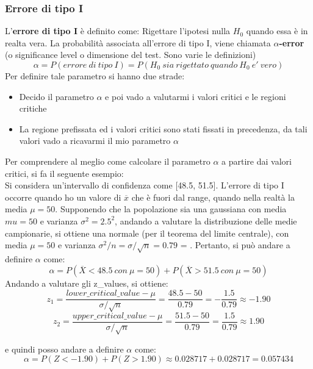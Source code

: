 \subsubsection{Errore di tipo I}
L'\textbf{errore di tipo I} è definito come: Rigettare l'ipotesi nulla \(H_0\) quando essa è in realta vera. La probabilità associata all'errore di tipo I, viene chiamata \textbf{\(\alpha\)-error} (o significance level o dimensione del test. Sono varie le definizioni)
\[
\alpha = P(errore\ di\ tipo\ I) = P(H_0\ sia\ rigettato\ quando\ H_0\ e'\ vero)
\]
Per definire tale parametro si hanno due strade:
\begin{itemize}
    \item Decido il parametro \(\alpha\) e poi vado a valutarmi i valori critici e le regioni critiche
    \item La regione prefissata ed i valori critici sono stati fissati in precedenza, da tali valori vado a ricavarmi il mio parametro \(\alpha\)
\end{itemize}
Per comprendere al meglio come calcolare il parametro \(\alpha\) a partire dai valori critici, si fa il seguente esempio:
\\
Si considera un'intervallo di confidenza come [48.5, 51.5]. L'errore di tipo I occorre quando ho un valore di \(\overline{x}\) che è fuori dal range, quando nella realtà la media \(\mu=50\). Supponendo che la popolazione sia una gaussiana con media \(mu = 50\) e varianza \(\sigma^2 = 2.5^2\), andando a valutare la distribuzione delle medie campionarie, si ottiene una normale (per il teorema del limite centrale), con media \(\mu = 50\) e varianza \(\sigma^2 / n = \sigma/\sqrt{n} = 0.79\) = . Pertanto, si può andare a definire \(\alpha\) come:
\[
\alpha = P(\overline{X} < 48.5\ con\ \mu = 50) + P(\overline{X} > 51.5\ con\ \mu = 50)
\]
Andando a valutare gli z\_values, si ottiene:
\[
z_1 = \frac{lower\_critical\_value - \mu}{\sigma/\sqrt{n}} = \frac{48.5 - 50}{0.79} = -\frac{1.5}{0.79} \approx -1.90
\]
\[
z_2 = \frac{upper\_critical\_value - \mu}{\sigma/\sqrt{n}} = \frac{51.5 - 50}{0.79} = \frac{1.5}{0.79} \approx 1.90
\]

e quindi posso andare a definire \(\alpha\) come:
\[
\alpha = P(Z < -1.90) + P(Z > 1.90) \approx 0.028717 + 0.028717 = 0.057434
\]

